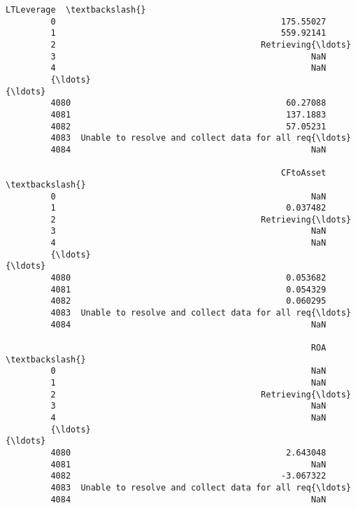 \documentclass[11pt]{article}
\begin{document}
\begin{Verbatim}[commandchars=\\\{\}]
                                                      LTLeverage  \textbackslash{}
         0                                             175.55027   
         1                                             559.92141   
         2                                         Retrieving{\ldots}   
         3                                                   NaN   
         4                                                   NaN   
         {\ldots}                                                 {\ldots}   
         4080                                           60.27088   
         4081                                           137.1883   
         4082                                           57.05231   
         4083  Unable to resolve and collect data for all req{\ldots}   
         4084                                                NaN   
         
                                                       CFtoAsset  \textbackslash{}
         0                                                   NaN   
         1                                              0.037482   
         2                                         Retrieving{\ldots}   
         3                                                   NaN   
         4                                                   NaN   
         {\ldots}                                                 {\ldots}   
         4080                                           0.053682   
         4081                                           0.054329   
         4082                                           0.060295   
         4083  Unable to resolve and collect data for all req{\ldots}   
         4084                                                NaN   
         
                                                             ROA  \textbackslash{}
         0                                                   NaN   
         1                                                   NaN   
         2                                         Retrieving{\ldots}   
         3                                                   NaN   
         4                                                   NaN   
         {\ldots}                                                 {\ldots}   
         4080                                           2.643048   
         4081                                                NaN   
         4082                                          -3.067322   
         4083  Unable to resolve and collect data for all req{\ldots}   
         4084                                                NaN   
         

\end{Verbatim}
\end{document}
